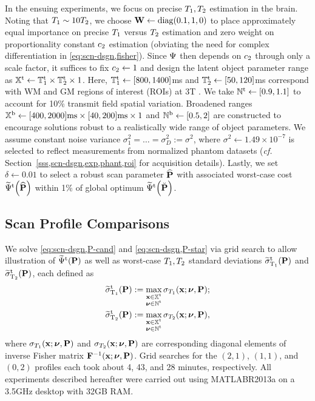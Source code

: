 In the ensuing experiments, 
we focus on precise $T_1,T_2$ estimation in the brain.
Noting that $T_1\sim10T_2$, 
we choose $\mathbf{W} \gets \mathrm{diag}\paren{0.1, 1, 0}$ 
to place approximately equal importance 
on precise $T_1$ versus $T_2$ estimation
and zero weight
on proportionality constant $c_{2}$ estimation
(obviating the need
for complex differentiation
in \eqref{eq:scn-dsgn,fisher}).
Since $\Psi$ then depends 
on $c_{2}$ through only a scale factor,
it suffices to fix $c_{2} \gets 1$
and design the latent object parameter range
as $\mathbb{X}^\mathrm{t} \gets \mathbb{T}_1^{\mathrm{t}} \times \mathbb{T}_2^{\mathrm{t}} \times 1$.
Here, 
$\mathbb{T}_1^{\mathrm{t}} \gets [800, 1400]$ms
and $\mathbb{T}_2^{\mathrm{t}} \gets [50, 120]$ms
correspond with WM and GM regions of interest (ROIs)
at 3T \cite{wansapura:99:nrt, stanisz:05:ttr}.
We take $\setNt \gets \brac{0.9, 1.1}$ 
to account for 10\% transmit field spatial variation. 
Broadened ranges 
$\mathbb{X}^\mathrm{b} \gets [400, 2000]\text{ms} \times [40, 200]\text{ms} \times 1$ 
and $\mathbb{N}^\mathrm{b} \gets [0.5, 2]$ are constructed 
to encourage solutions robust 
to a realistically wide range of object parameters. 
We assume constant noise variance 
$\sigma_1^2 = \dots = \sigma_D^2 := \sigma^2$, 
where $\sigma^2 \gets 1.49 \times 10^{-7}$ is selected 
to reflect measurements from normalized phantom datasets 
(\emph{cf.} Section~\ref{sss,scn-dsgn,exp,phant,roi}  
for acquisition details).
Lastly, we set $\delta \gets 0.01$ 
to select a robust scan parameter $\widehat{\mathbf{P}}$ 
with associated worst-case cost $\costawt{\bmPs}$ 
within 1\% of global optimum $\costawt{\bmPc}$.

\subsection{Scan Profile Comparisons}
\label{ss,scn-dsgn,opt,compare} 

We solve \eqref{eq:scn-dsgn,P-cand} and \eqref{eq:scn-dsgn,P-star} 
via grid search 
to allow illustration 
of $\widetilde{\Psi}^{\mathrm{t}}(\mathbf{P})$ 
as well as worst-case $T_1,T_2$ standard deviations 
$\widetilde{\sigma}_{\mathrm{T}_1}^\mathrm{t}(\mathbf{P})$ and $\widetilde{\sigma}_{\mathrm{T}_2}^\mathrm{t}(\mathbf{P})$, 
each defined as
\begin{align}
	\widetilde{\sigma}_{\mathrm{T}_1}^\mathrm{t}(\mathbf{P}) &:= 
		\max_{\substack{\mathbf{x} \in \mathbb{X}^\mathrm{t} \\ \boldsymbol{\nu} \in \mathbb{N}^\mathrm{t}}} 
		\sigma_{T_1}(\mathbf{x}; \boldsymbol{\nu}, \mathbf{P}); 
		\label{eq:scn-dsgn,sigwot} \\
	\widetilde{\sigma}_{\mathrm{T}_2}^\mathrm{t}(\mathbf{P}) &:= 
		\max_{\substack{\mathbf{x} \in \mathbb{X}^\mathrm{t} \\ \boldsymbol{\nu} \in \mathbb{N}^\mathrm{t}}} 
		\sigma_{T_2}(\mathbf{x}; \boldsymbol{\nu}, \mathbf{P}), 
		\label{eq:scn-dsgn,sigwtt} 
\end{align}
where $\sigma_{T_1}(\mathbf{x}; \boldsymbol{\nu}, \mathbf{P})$ 
and $\sigma_{T_2}(\mathbf{x}; \boldsymbol{\nu}, \mathbf{P})$ 
are corresponding diagonal elements 
of inverse Fisher matrix $\mathbf{F}^{-1}(\mathbf{x}; \boldsymbol{\nu}, \mathbf{P})$. 
Grid searches for the $(2,1)$, $(1,1)$, and $(0,2)$ profiles 
each took about 4, 43, and 28 minutes, respectively.
All experiments described hereafter were carried out 
using MATLAB\regis R2013a 
on a 3.5GHz desktop with 32GB RAM. 

